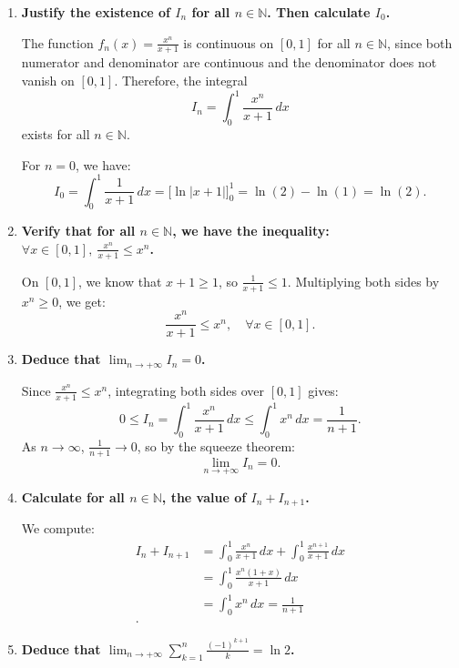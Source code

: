 \documentclass[12pt]{article}
\begin{document}
\begin{answerbox}
  \begin{enumerate}
    \item \textbf{Justify the existence of $ I_n $ for all $ n \in \mathbb{N} $. Then calculate $ I_0 $.}

    The function $ f_n(x) = \frac{x^n}{x + 1} $ is continuous on $[0, 1]$ for all $ n \in \mathbb{N} $, since both numerator and denominator are continuous and the denominator does not vanish on $[0, 1]$. Therefore, the integral
    $$
    I_n = \int_0^1 \frac{x^n}{x + 1}\,dx
    $$
    exists for all $ n \in \mathbb{N} $.

    For $ n = 0 $, we have:
    $$
    I_0 = \int_0^1 \frac{1}{x + 1}\,dx = \Big[\ln|x + 1|\Big]_0^1 = \ln(2) - \ln(1) = \ln(2).
    $$

    \item \textbf{Verify that for all $ n \in \mathbb{N} $, we have the inequality: $ \forall x \in [0, 1],\ \frac{x^n}{x + 1} \leq x^n $.}

    On $[0, 1]$, we know that $ x + 1 \geq 1 $, so $ \frac{1}{x + 1} \leq 1 $. Multiplying both sides by $ x^n \geq 0 $, we get:
    $$
    \frac{x^n}{x + 1} \leq x^n, \quad \forall x \in [0, 1].
    $$

    \item \textbf{Deduce that $ \lim_{n \to +\infty} I_n = 0 $.}

    Since $ \frac{x^n}{x + 1} \leq x^n $, integrating both sides over $[0, 1]$ gives:
    $$
    0 \leq I_n = \int_0^1 \frac{x^n}{x + 1}\,dx \leq \int_0^1 x^n\,dx = \frac{1}{n + 1}.
    $$
    As $ n \to \infty $, $ \frac{1}{n + 1} \to 0 $, so by the squeeze theorem:
    $$
    \lim_{n \to +\infty} I_n = 0.
    $$

    \item \textbf{Calculate for all $ n \in \mathbb{N} $, the value of $ I_n + I_{n+1} $.}

    We compute:
    $$
    \begin{aligned}
    I_n + I_{n+1} &= \int_0^1 \frac{x^n}{x + 1}\,dx + \int_0^1 \frac{x^{n+1}}{x + 1}\,dx \\
    &= \int_0^1 \frac{x^n(1 + x)}{x + 1}\,dx \\ 
    &= \int_0^1 x^n\,dx = \frac{1}{n + 1} \\.
    \end{aligned}
    $$

    \item \textbf{Deduce that $ \lim_{n \to +\infty} \sum_{k=1}^n \frac{(-1)^{k+1}}{k} = \ln 2 $.}


\end{enumerate}
\end{answerbox}
\end{document}
